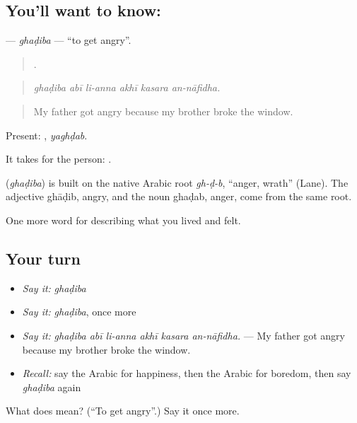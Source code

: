 \subsection*{You'll want to know: }
\textbf{} — \emph{ghaḍiba} — \textquotedblleft{}to get angry\textquotedblright{}.

\begin{quote}
     .
\end{quote}

\begin{quote}
\emph{ghaḍiba abī li-anna akhī kasara an-nāfidha.}
\end{quote}

\begin{quote}
My father got angry because my brother broke the window.
\end{quote}

Present: , \emph{yaghḍab}.

It takes  for the person:   .

\begin{cousinweb}
\textbf{} (\emph{ghaḍiba}) is built on the native Arabic root \emph{gh-ḍ-b}, \textquotedblleft{}anger, wrath\textquotedblright{} (Lane). The adjective ghāḍib, angry, and the noun ghaḍab, anger, come from the same root.
\end{cousinweb}

\begin{grammarlens}[title={What you've built}]
One more word for describing what you lived and felt.
\end{grammarlens}

\subsection*{Your turn}
\begin{itemize}
\raggedright
  \item \emph{Say it:} \emph{ghaḍiba}
  \item \emph{Say it:} \emph{ghaḍiba}, once more
  \item \emph{Say it:} \emph{ghaḍiba abī li-anna akhī kasara an-nāfidha.} — My father got angry because my brother broke the window.
  \item \emph{Recall:} say the Arabic for happiness, then the Arabic for boredom, then say \emph{ghaḍiba} again
\end{itemize}

\begin{tcolorbox}[breakable,colback=teal!4,colframe=teal!35!black,title={Before you move on}]
What does  mean? (\textquotedblleft{}To get angry\textquotedblright{}.) Say it once more.
\end{tcolorbox}
